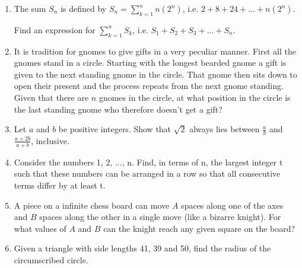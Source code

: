 \documentclass{article}
\begin{document}
\begin{enumerate}
    \item
    The sum $S_n$ is defined by $S_n = \sum\limits_{k=1}^{n} n(2^n)$, i.e. $2 + 8 + 24 + ... + n(2^n)$.
    
    Find an expression for $\sum\limits_{k=1}^n S_k$, i.e. $S_1 + S_2 + S_3 + ... + S_n$.
    
    \item
    It is tradition for gnomes to give gifts in a very peculiar manner. First all the gnomes stand in a circle. Starting with the longest bearded gnome a gift is given to the next standing gnome in the circle. That gnome then sits down to open their present and the process repeats from the next gnome standing. Given that there are $n$ gnomes in the circle, at what position in the circle is the last standing gnome who therefore doesn’t get a gift?
    
    \item
    Let $a$ and $b$ be positive integers. Show that $\sqrt{2}$ always lies between $\frac{a}{b}$ and $\frac{a+2b}{a+b}$, inclusive.
    
    \item
    Consider the numbers 1, 2, ..., n. Find, in terms of n, the largest integer t such that these numbers can be arranged in a row so that all consecutive terms differ by at least t.
    
    \item
    A piece on a infinite chess board can move $A$ spaces along one of the axes and $B$ spaces along the other in a single move (like a bizarre knight). For what values of $A$ and $B$ can the knight reach any given square on the board?
    
    \item
    Given a triangle with side lengths 41, 39 and 50, find the radius of the circumscribed circle.
    
    
    
    
\end{enumerate}
\end{document}
